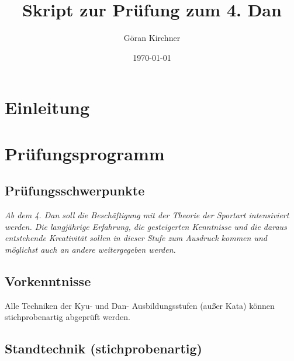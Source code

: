 \documentclass[justified, a4paper, notitlepage, captions=tableheading, nobib]{tufte-handout}
\author{Göran Kirchner}
\date{\today}
\title{Skript zur Prüfung zum 4. Dan}
\begin{document}
\maketitle
\tableofcontents

\ifxetex
  \newcommand{\textls}[2][5]{%
    \begingroup\addfontfeatures{LetterSpace=#1}#2\endgroup
  }
  \renewcommand{\allcapsspacing}[1]{\textls[15]{#1}}
  \renewcommand{\smallcapsspacing}[1]{\textls[10]{#1}}
  \renewcommand{\allcaps}[1]{\textls[15]{\MakeTextUppercase{#1}}}
  \renewcommand{\smallcaps}[1]{\smallcapsspacing{\scshape\MakeTextLowercase{#1}}}
  \renewcommand{\textsc}[1]{\smallcapsspacing{\textsmallcaps{#1}}}
\fi

\newpage
\section{Einleitung}
\label{sec:org465b893}

\newpage
\section{Prüfungsprogramm}
\label{sec:org1225400}
\subsection{Prüfungsschwerpunkte}
\label{sec:org421898e}
\emph{Ab dem 4. Dan soll die Beschäftigung mit der Theorie der Sportart intensiviert werden.
Die langjährige Erfahrung, die gesteigerten Kenntnisse und die daraus entstehende Kreativität sollen in dieser Stufe zum Ausdruck kommen und möglichst auch an andere weitergegeben werden.}

\subsection{Vorkenntnisse}
\label{sec:org2f1efd7}
Alle Techniken der Kyu- und Dan- Ausbildungsstufen (außer Kata) können stichprobenartig abgeprüft werden.

\subsection{Standtechnik (stichprobenartig)}
\label{sec:orged36c59}
\end{document}
